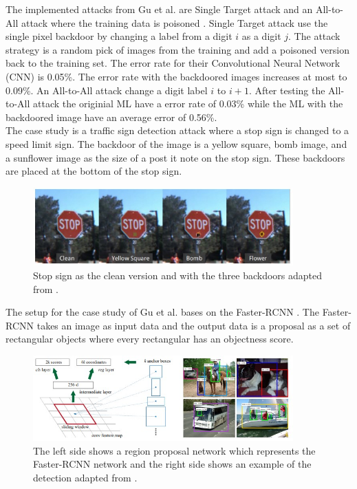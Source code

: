 The implemented attacks from Gu et al. are Single Target attack and an All-to-All attack where the training data is poisoned \cite{DBLP:conf/ccs/HuangJNRT11}. Single Target attack use the single pixel backdoor by changing a label from a digit $i$ as a digit $j$. The attack strategy is a random pick of images from the training and add a poisoned version back to the training set. The error rate for their Convolutional Neural Network (CNN) is 0.05\%. The error rate with the backdoored images increases at most to 0.09\%. An All-to-All attack change a digit label $i$ to $i + 1$. After testing the All-to-All attack the originial ML have a error rate of 0.03\% while the ML with the backdoored image have an average error of 0.56\%. \\ The case study is a traffic sign detection attack where a stop sign is changed to a speed limit sign. The backdoor of the image is a yellow square, bomb image, and a sunflower image as the size of a post it note on the stop sign. These backdoors are placed at the bottom of the stop sign.

\begin{figure}[ht!]
  \centering
  \includegraphics[width=10cm]{pictures/stop_sign.jpg}
  \caption{Stop sign as the clean version and with the three backdoors adapted from \cite{DBLP:journals/corr/abs-1708-06733}.}
  \label{fig:stop_sign}
\end{figure}

The setup for the case study of Gu et al. bases on the Faster-RCNN \cite{DBLP:conf/nips/RenHGS15}. The Faster-RCNN takes an image as input data and the output data is a proposal as a set of rectangular objects where every rectangular has an objectness score.

\begin{figure}[ht!]
  \centering
  \includegraphics[width=10cm]{pictures/f_rcnn.jpg}
  \caption{The left side shows a region proposal network which represents the Faster-RCNN network and the right side shows an example of the detection adapted from \cite{DBLP:conf/nips/RenHGS15}.}
  \label{fig:f_rcnn}
\end{figure}

